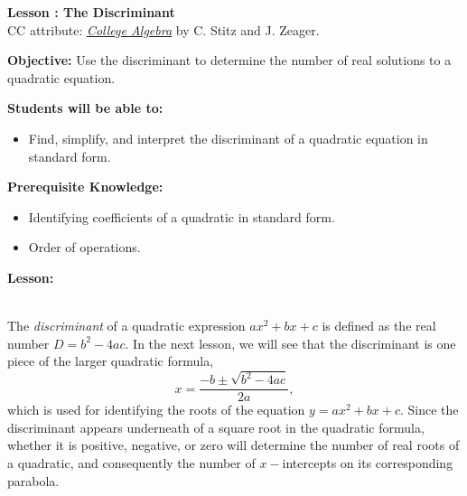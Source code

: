 \documentclass[12pt]{article}
\theoremstyle{definition}
\begin{document}
{\bf \large Lesson : The Discriminant}
\\ CC attribute: \href{http://www.stitz-zeager.com}{\it{College Algebra}} by C. Stitz and J. Zeager. 
\hfill \doclicenseImage[imagewidth=5em]\\
\par
{\bf Objective:} Use the discriminant to determine the number of real solutions to a quadratic equation.\\
\par
{\bf Students will be able to:}
\begin{itemize}
	\item Find, simplify, and interpret the discriminant of a quadratic equation in standard form.
\end{itemize}
{\bf Prerequisite Knowledge:}
\begin{itemize}
	\item Identifying coefficients of a quadratic in standard form.
	\item Order of operations.
\end{itemize}
\hrulefill

{\bf Lesson:}\\
\ \par
The {\it discriminant} of a quadratic expression $ax^2+bx+c$ is defined as the real number $D=b^2-4ac$.  In the next lesson, we will see that the discriminant is one piece of the larger quadratic formula,
$$x=\dfrac{-b\pm\sqrt{b^2-4ac}}{2a},$$
which is used for identifying the roots of the equation $y=ax^2+bx+c$.
Since the discriminant appears underneath of a square root in the quadratic formula, whether it is positive, negative, or zero will determine the number of real roots of a quadratic, and consequently the number of $x-$intercepts on its corresponding parabola.

\begin{center}
\end{center}
\end{document}
